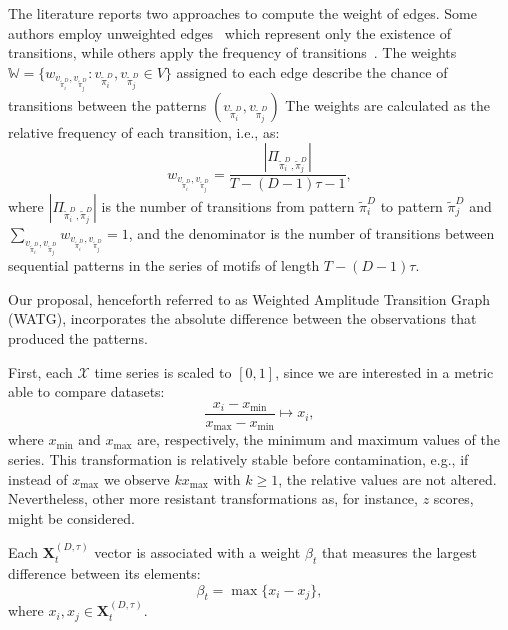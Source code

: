 \documentclass[journal]{IEEEtran}
\begin{document}
The literature reports two approaches to compute the weight of edges.
Some authors employ unweighted edges~\cite{McCullough2015lagged,Kulp2016ordinal} which represent only the existence of transitions, while others apply the frequency of transitions~\cite{Sorrentino2015periodic,Zhang2017ConstructingOP}.
The weights $\mathbb{W} = \{w_{v_{\widetilde{\pi}^D_i}, v_{\widetilde\pi^D_j}}: v_{\widetilde\pi^D_i}, v_{\widetilde\pi^D_j} \in V \}$ assigned to each edge describe the chance of transitions between the patterns $(v_{\widetilde\pi^D_i}, v_{\widetilde\pi^D_j})$
The weights are calculated as the relative frequency of each transition, i.e., as:
\begin{equation}
w_{v_{\widetilde\pi^D_i}, v_{\widetilde\pi^D_j}} = \frac{|\Pi_{\widetilde\pi^D_i,\widetilde\pi^D_j}|}{T-(D-1)\tau-1},
\end{equation}
where $|\Pi_{\widetilde\pi^D_i,\widetilde\pi^D_j}|$ is the number of transitions from pattern $\widetilde\pi^D_i$ to pattern $\widetilde\pi^D_j$ and $\sum_{v_{\widetilde\pi^D_i}, v_{\widetilde\pi^D_j}}w_{v_{\widetilde\pi^D_i}, v_{\widetilde\pi^D_j}} = 1$,
and the denominator is the number of transitions between sequential patterns in the series of motifs of length $T-(D-1)\tau$.

Our proposal, henceforth referred to as Weighted Amplitude Transition Graph (WATG), incorporates the absolute difference between the observations that produced the patterns.


First, each $\mathcal{X}$ time series is scaled to $[0, 1]$, since we are interested in a metric able to compare datasets:
\begin{equation}
 \frac{x_i - x_{\min}}{x_{\max} - x_{\min}} \longmapsto x_i,
\end{equation}
where $x_{\min}$ and $x_{\max}$ are, respectively, the minimum and maximum values of the series.
This transformation is relatively stable before contamination, e.g., if instead of $x_{\max}$ we observe $k x_{\max}$ with $k\geq 1$, the relative values are not altered. Nevertheless, other more resistant transformations as, for instance, $z$ scores, might be considered.


Each $\mathbf{X}^{(D, \tau)}_t$ vector is associated with a weight $\beta_t$ that measures the largest difference between its elements:
\begin{equation}
\beta_t = \max\{x_i - x_j\},
\end{equation}
where $x_i, x_j \in \mathbf{X}^{(D, \tau)}_t$.
\end{document}
